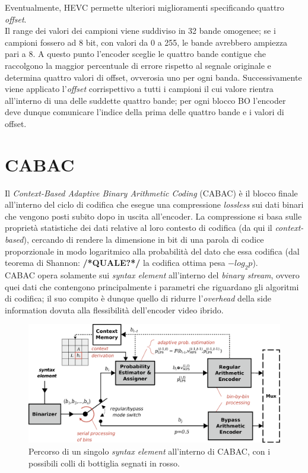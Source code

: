 Eventualmente, HEVC permette ulteriori miglioramenti specificando quattro 
\emph{offset}. \\
Il range dei valori dei campioni viene suddiviso in 32 bande omogenee; se i 
campioni fossero ad 8 bit, con valori da 0 a 255, le bande avrebbero ampiezza 
pari a 8. A questo punto l'encoder sceglie le quattro bande contigue che 
raccolgono la maggior percentuale di errore rispetto al segnale originale e 
determina quattro valori di offset, ovverosia uno per ogni banda. 
Successivamente viene applicato l'\emph{offset} corrispettivo a tutti i campioni
il cui valore rientra all'interno di una delle suddette quattro bande; per ogni 
blocco BO l'encoder deve dunque comunicare l'indice della prima delle quattro 
bande e i valori di offset.


\section{CABAC}
Il \emph{Context-Based Adaptive Binary Arithmetic Coding} (CABAC) è il blocco 
finale all'interno del ciclo di codifica che esegue una compressione 
\emph{lossless} sui dati binari che vengono posti subito dopo in uscita 
all'encoder. La compressione si basa sulle proprietà statistiche dei dati 
relative al loro contesto di codifica (da qui il \emph{context-based}), cercando
di rendere la dimensione in bit di una parola di codice proporzionale in modo 
logaritmico alla probabilità del dato che essa codifica (dal teorema di Shannon:
\textbf{/*QUALE?*/} la codifica ottima pesa $-log_2p$). \\
CABAC opera solamente sui \emph{syntax element} all'interno del \emph{binary 
stream}, ovvero quei dati che contengono principalmente i parametri che 
riguardano gli algoritmi di codifica; il suo compito è dunque quello di ridurre
l'\emph{overhead} della side information dovuta alla flessibilità dell'encoder 
video ibrido. \\

\begin{figure}[H]
  \centering
  \captionsetup{justification=raggedright}
  \includegraphics[scale=0.35]{Figures/Cabac_overview}
  \caption[Percorso di un \emph{syntax element} dentro CABAC]
	  {Percorso di un singolo \emph{syntax element} all'interno di CABAC,
	   con i possibili colli di bottiglia segnati in rosso.}
\end{figure}

